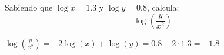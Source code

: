 \documentclass[addpoints,spanish, 12pt,a4paper]{exam}
\begin{document}
\begin{questions}
\begin{parts}


\end{parts}



\question[1] Sabiendo que $\log x=1.3$ y $\log y=0.8$, calcula: $$\log (\frac{y}{x^2})$$
\begin{solution}
$\log (\frac{y}{x^2})=- 2 \log{\left(x \right)} + \log{\left(y \right)}=0.8 - 2 \cdot 1.3=-1.8$
\end{solution}



\end{questions}
\end{document}
